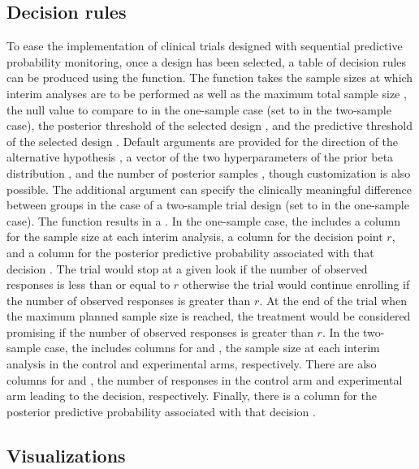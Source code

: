 \hypertarget{decision-rules}{%
\subsection{Decision rules}\label{decision-rules}}

To ease the implementation of clinical trials designed with sequential
predictive probability monitoring, once a design has been selected, a
table of decision rules can be produced using the
 function. The function takes the sample
sizes  at which interim analyses are to be performed as well as
the maximum total sample size , the null value to compare to in
the one-sample case  (set to  in the two-sample
case), the posterior threshold of the selected design , and
the predictive threshold of the selected design . Default
arguments are provided for the direction of the alternative hypothesis
, a vector of the two hyperparameters of the prior beta
distribution , and the number of posterior samples ,
though customization is also possible. The additional argument
 can specify the clinically meaningful difference between
groups in the case of a two-sample trial design (set to  in
the one-sample case). The function results in a . In the
one-sample case, the  includes a column for the sample size
 at each interim analysis, a column for the decision point
\(r\), and a column for the posterior predictive probability associated
with that decision . The trial would stop at a given look if
the number of observed responses is less than or equal to \(r\)
otherwise the trial would continue enrolling if the number of observed
responses is greater than \(r\). At the end of the trial when the
maximum planned sample size is reached, the treatment would be
considered promising if the number of observed responses is greater than
\(r\). In the two-sample case, the  includes columns for
 and , the sample size at each interim analysis in the
control and experimental arms, respectively. There are also columns for
 and , the number of responses in the control arm and
experimental arm leading to the decision, respectively. Finally, there
is a column for the posterior predictive probability associated with
that decision .

\hypertarget{visualizations}{%
\subsection{Visualizations}\label{visualizations}}

